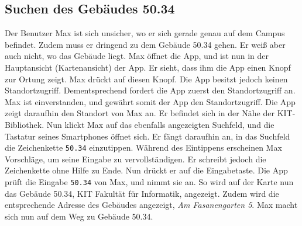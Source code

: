 \subsection{Suchen des Gebäudes 50.34}

Der \Gls{Benutzer} Max ist sich unsicher, wo er sich gerade genau auf dem \Gls{Campus} befindet.
Zudem muss er dringend zu dem Gebäude 50.34 gehen.
Er weiß aber auch nicht, wo das Gebäude liegt.
Max öffnet die App, und ist nun in der Hauptansicht (\Gls{Kartenansicht}) der App.
Er sieht, dass ihm die App einen Knopf zur \Gls{Ortung} zeigt.
Max drückt auf diesen Knopf.
Die App besitzt jedoch keinen Standortzugriff.
Dementsprechend fordert die App zuerst den Standortzugriff an.
Max ist einverstanden, und gewährt somit der App den Standortzugriff.
Die App zeigt daraufhin den Standort von Max an.
Er befindet sich in der Nähe der \Gls{KIT}-Bibliothek.
Nun klickt Max auf das ebenfalls angezeigten \Gls{Suchfeld}, und die Tastatur seines Smartphones öffnet sich.
Er fängt daraufhin an, in das \Gls{Suchfeld} die \Gls{Zeichenkette} \texttt{50.34} einzutippen. 
Während des Eintippens erscheinen Max Vorschläge, um seine Eingabe zu vervollständigen. 
Er schreibt jedoch die \Gls{Zeichenkette} ohne Hilfe zu Ende. 
Nun drückt er auf die Eingabetaste. 
Die App prüft die Eingabe \texttt{50.34} von Max, und nimmt sie an. 
So wird auf der Karte nun das Gebäude 50.34, \Gls{KIT} Fakultät für Informatik, angezeigt. 
Zudem wird die entsprechende Adresse des Gebäudes angezeigt, \textit{Am Fasanengarten 5}. 
Max macht sich nun auf dem Weg zu Gebäude 50.34.